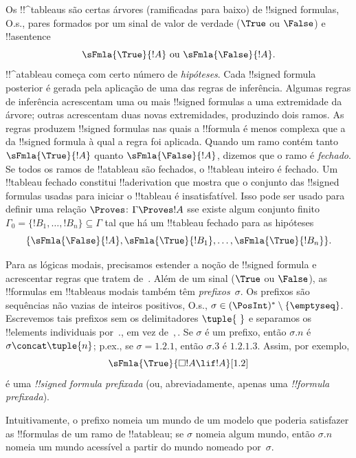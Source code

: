 \documentclass[../../../include/open-logic-section]{subfiles}
\begin{document}


Os !!^{tableau}s são certas árvores (ramificadas para baixo) de
!!{signed formula}s, O.s.\@, pares formados por um sinal de valor de
verdade ($\True$ ou $\False$) e !!a{sentence}
\[
\sFmla{\True}{!A} \text{ ou } \sFmla{\False}{!A}.
\]
!!^a{tableau} começa com certo número de \emph{hipóteses}. Cada
!!{signed formula} posterior é gerada pela aplicação de uma das regras
de inferência. Algumas regras de inferência acrescentam uma ou mais
!!{signed formula}s a uma extremidade da árvore; outras acrescentam duas
novas extremidades, produzindo dois ramos. As regras produzem !!{signed
formula}s nas quais a !!{formula} é menos complexa que a da !!{signed
formula} à qual a regra foi aplicada. Quando um ramo contém tanto
$\sFmla{\True}{!A}$ quanto $\sFmla{\False}{!A}$, dizemos que o ramo é
\emph{fechado}. Se todos os ramos de !!a{tableau} são fechados, o
!!{tableau} inteiro é fechado. Um !!{tableau} fechado constitui
!!a{derivation} que mostra que o conjunto das !!{signed formula}s usadas
para iniciar o !!{tableau} é insatisfatível. Isso pode ser usado para
definir uma relação $\Proves$: $\Gamma \Proves !A$ sse existe algum
conjunto finito~$\Gamma_0 = \{!B_1, \dots, !B_n\} \subseteq \Gamma$ tal
que há um !!{tableau} fechado para as hipóteses
\[
\{\sFmla{\False}{!A}, \sFmla{\True}{!B_1}, \dots, \sFmla{\True}{!B_n}\}.
\]

Para as lógicas modais, precisamos estender a noção de !!{signed
formula} e acrescentar regras que tratem de~. Além de um sinal
($\True$ ou $\False$), as !!{formula}s em !!{tableau}s modais também
têm \emph{prefixos}~$\sigma$. Os prefixos são sequências não vazias de
inteiros positivos, O.s.\@, $\sigma \in (\PosInt)^* \setminus
\{\emptyseq\}$. Escrevemos tais prefixos sem os delimitadores
$\tuple{\ }$ e separamos os !!{element}s individuais por~$.$, em vez
de~$,$. Se $\sigma$ é um prefixo, então $\sigma.n$ é $\sigma
\concat \tuple{n}$; p.ex., se $\sigma = 1.2.1$, então $\sigma.3$
é $1.2.1.3$. Assim, por exemplo,
\[
\sFmla{\True}{\Box !A \lif !A}[1.2]
\]
é uma \emph{!!{signed formula} prefixada} (ou, abreviadamente, apenas uma
\emph{!!{formula} prefixada}).

Intuitivamente, o prefixo nomeia um mundo de um modelo que poderia
satisfazer as !!{formula}s de um ramo de !!a{tableau}; se $\sigma$
nomeia algum mundo, então $\sigma.n$ nomeia um mundo acessível a partir
do mundo nomeado por~$\sigma$.
\end{document}

